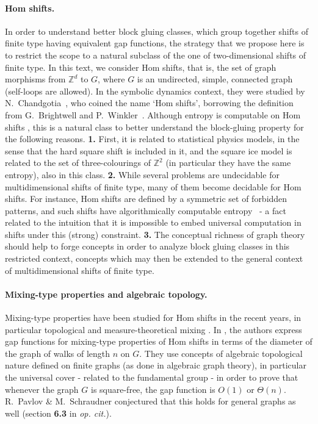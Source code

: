\documentclass{article}
\begin{document}
\paragraph*{Hom shifts.} In order to understand better block 
gluing classes, which group together shifts of finite type having equivalent gap functions,
the strategy that we propose here is to restrict the scope to a natural subclass 
of the one of two-dimensional shifts of finite type. In this text, we consider Hom shifts, 
that is, the set of graph morphisms from $\mathbb{Z}^d$ to $G$, where $G$ is an undirected, simple, connected graph (self-loops are allowed). In the symbolic dynamics context, they were studied by N.~Chandgotia~\cite{C17}, who coined the name `Hom shifts', borrowing the definition from G.~Brightwell and P.~Winkler~\cite{BW00}. Although entropy is computable on Hom shifts \cite{F97}, this is a natural class to better understand the block-gluing property 
for the following reasons. \textbf{1.} First, it is related to statistical physics models, in the sense that the hard square shift is 
included in it, and the square ice model is related to the set of three-colourings of $\mathbb Z^2$ (in particular they have the same entropy), also in this class. \textbf{2.} While several problems are undecidable for multidimensional shifts of finite type, 
many of them become decidable for Hom shifts. For instance, 
Hom shifts are defined by a symmetric set of forbidden patterns, and such shifts have algorithmically computable entropy~\cite{F97} - a fact related to the intuition that it is impossible to embed universal computation in shifts under this (strong) constraint. 
\textbf{3.} The conceptual richness of graph theory should help to forge concepts in order to analyze 
block gluing classes in this restricted context, concepts 
which may then be extended to the general context of multidimensional shifts of finite type. 

\paragraph*{Mixing-type properties and algebraic topology.}
Mixing-type properties have been studied for Hom shifts 
in the recent years, in particular topological and measure-theoretical mixing \cite{B17, CM18, B21}.
In \cite{CM18}, the authors express gap functions for mixing-type properties of Hom shifts in terms of the diameter of 
the graph of walks of length $n$ on $G$. They use concepts of algebraic topological nature defined on finite graphs (as done in algebraic graph theory), in particular the universal cover - related to the fundamental group - in order to prove that whenever the graph $G$ is square-free, the gap function is $O(1)$ or $\Theta(n)$.
R.~Pavlov \& M.~Schraudner conjectured that this holds for general graphs as well (section \textbf{6.3} in \emph{op. cit.}). 
\end{document}

